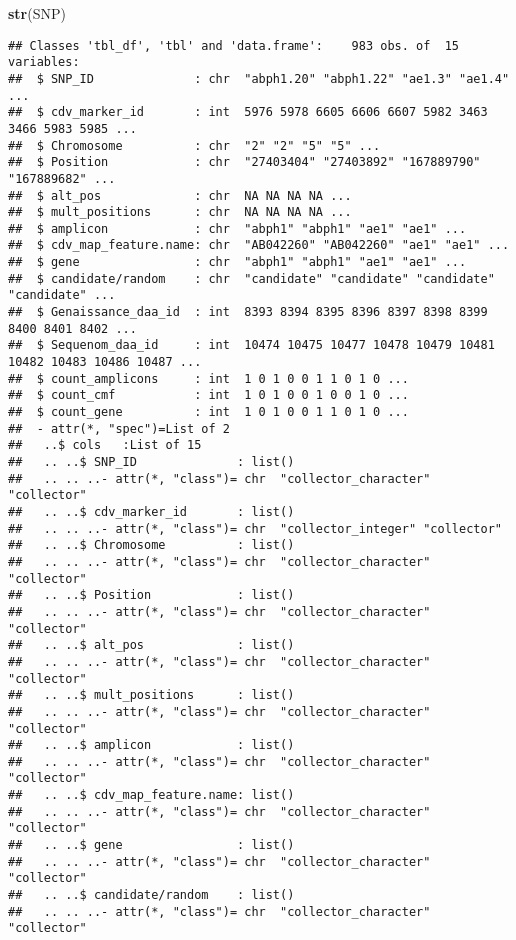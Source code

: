 \documentclass[]{article}
\newenvironment{Shaded}{\begin{snugshade}}{\end{snugshade}}
\newcommand{\KeywordTok}[1]{\textcolor[rgb]{0.13,0.29,0.53}{\textbf{#1}}}
\newcommand{\NormalTok}[1]{#1}
\begin{document}
\begin{Shaded}
\begin{Highlighting}[]
\KeywordTok{str}\NormalTok{(SNP)}
\end{Highlighting}
\end{Shaded}

\begin{verbatim}
## Classes 'tbl_df', 'tbl' and 'data.frame':    983 obs. of  15 variables:
##  $ SNP_ID              : chr  "abph1.20" "abph1.22" "ae1.3" "ae1.4" ...
##  $ cdv_marker_id       : int  5976 5978 6605 6606 6607 5982 3463 3466 5983 5985 ...
##  $ Chromosome          : chr  "2" "2" "5" "5" ...
##  $ Position            : chr  "27403404" "27403892" "167889790" "167889682" ...
##  $ alt_pos             : chr  NA NA NA NA ...
##  $ mult_positions      : chr  NA NA NA NA ...
##  $ amplicon            : chr  "abph1" "abph1" "ae1" "ae1" ...
##  $ cdv_map_feature.name: chr  "AB042260" "AB042260" "ae1" "ae1" ...
##  $ gene                : chr  "abph1" "abph1" "ae1" "ae1" ...
##  $ candidate/random    : chr  "candidate" "candidate" "candidate" "candidate" ...
##  $ Genaissance_daa_id  : int  8393 8394 8395 8396 8397 8398 8399 8400 8401 8402 ...
##  $ Sequenom_daa_id     : int  10474 10475 10477 10478 10479 10481 10482 10483 10486 10487 ...
##  $ count_amplicons     : int  1 0 1 0 0 1 1 0 1 0 ...
##  $ count_cmf           : int  1 0 1 0 0 1 0 0 1 0 ...
##  $ count_gene          : int  1 0 1 0 0 1 1 0 1 0 ...
##  - attr(*, "spec")=List of 2
##   ..$ cols   :List of 15
##   .. ..$ SNP_ID              : list()
##   .. .. ..- attr(*, "class")= chr  "collector_character" "collector"
##   .. ..$ cdv_marker_id       : list()
##   .. .. ..- attr(*, "class")= chr  "collector_integer" "collector"
##   .. ..$ Chromosome          : list()
##   .. .. ..- attr(*, "class")= chr  "collector_character" "collector"
##   .. ..$ Position            : list()
##   .. .. ..- attr(*, "class")= chr  "collector_character" "collector"
##   .. ..$ alt_pos             : list()
##   .. .. ..- attr(*, "class")= chr  "collector_character" "collector"
##   .. ..$ mult_positions      : list()
##   .. .. ..- attr(*, "class")= chr  "collector_character" "collector"
##   .. ..$ amplicon            : list()
##   .. .. ..- attr(*, "class")= chr  "collector_character" "collector"
##   .. ..$ cdv_map_feature.name: list()
##   .. .. ..- attr(*, "class")= chr  "collector_character" "collector"
##   .. ..$ gene                : list()
##   .. .. ..- attr(*, "class")= chr  "collector_character" "collector"
##   .. ..$ candidate/random    : list()
##   .. .. ..- attr(*, "class")= chr  "collector_character" "collector"

\end{verbatim}
\end{document}

